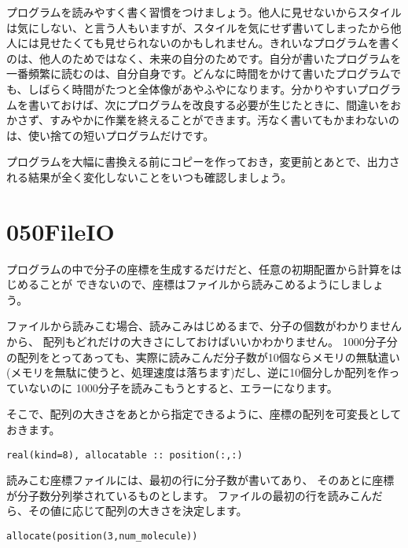 \documentclass[a4,10pt]{article}
\begin{document}
\begin{shadebox}
    プログラムを読みやすく書く習慣をつけましょう。他人に見せないからスタイルは気にしない、と言う人もいますが、スタイルを気にせず書いてしまったから他人には見せたくても見せられないのかもしれません。きれいなプログラムを書くのは、他人のためではなく、未来の自分のためです。自分が書いたプログラムを一番頻繁に読むのは、自分自身です。どんなに時間をかけて書いたプログラムでも、しばらく時間がたつと全体像があやふやになります。分かりやすいプログラムを書いておけば、次にプログラムを改良する必要が生じたときに、間違いをおかさず、すみやかに作業を終えることができます。汚なく書いてもかまわないのは、使い捨ての短いプログラムだけです。
\end{shadebox} 

\begin{shadebox}
	プログラムを大幅に書換える前にコピーを作っておき，変更前とあとで、出力される結果が全く変化しないことをいつも確認しましょう。
\end{shadebox}



\section{050FileIO}

プログラムの中で分子の座標を生成するだけだと、任意の初期配置から計算をはじめることが
できないので、座標はファイルから読みこめるようにしましょう。

ファイルから読みこむ場合、読みこみはじめるまで、分子の個数がわかりませんから、
配列もどれだけの大きさにしておけばいいかわかりません。
1000分子分の配列をとってあっても、実際に読みこんだ分子数が10個ならメモリの無駄遣い
(メモリを無駄に使うと、処理速度は落ちます)だし、逆に10個分しか配列を作っていないのに
1000分子を読みこもうとすると、エラーになります。

そこで、配列の大きさをあとから指定できるように、座標の配列を可変長としておきます。
\begin{screen}\begin{verbatim}
real(kind=8), allocatable :: position(:,:)
\end{verbatim}\end{screen}

読みこむ座標ファイルには、最初の行に分子数が書いてあり、
そのあとに座標が分子数分列挙されているものとします。
ファイルの最初の行を読みこんだら、その値に応じて配列の大きさを決定します。
\begin{screen}\begin{verbatim}
allocate(position(3,num_molecule))
\end{verbatim}\end{screen}
\end{document}
